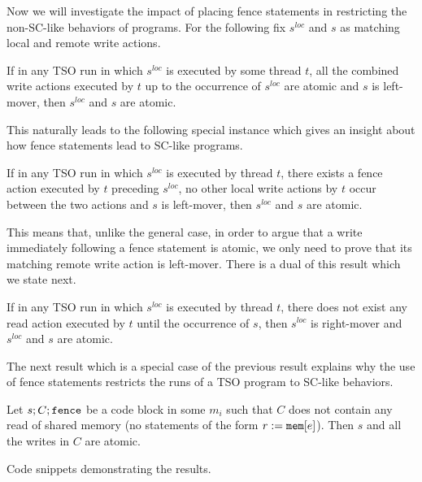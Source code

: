 Now we will investigate the impact of placing fence statements in restricting the non-SC-like behaviors of programs.
For the following fix $s^{loc}$ and $s$ as matching local and remote write actions.
\begin{lemma}
If in any TSO run in which $s^{loc}$ is executed by some thread $t$, all the combined write actions executed by $t$ up to the occurrence of $s^{loc}$ are atomic and $s$ is left-mover, then $s^{loc}$ and $s$ are atomic.
\end{lemma}
This naturally leads to the following special instance which gives an insight about how fence statements lead to SC-like programs.
\begin{corollary}
If in any TSO run in which $s^{loc}$ is executed by thread $t$, there exists a fence action executed by $t$ preceding $s^{loc}$, no other local write actions by $t$ occur between the two actions and $s$ is left-mover, then $s^{loc}$ and $s$ are atomic.
\end{corollary}
This means that, unlike the general case, in order to argue that a write immediately following a fence statement is atomic, we only need to prove that its matching remote write action is left-mover. 
There is a dual of this result which we state next.
\begin{lemma}
If in any TSO run in which $s^{loc}$ is executed by thread $t$, there does not exist any read action executed by $t$ until the occurrence of $s$, then $s^{loc}$ is right-mover and $s^{loc}$ and $s$ are atomic.
\end{lemma}
The next result which is a special case of the previous result explains why the use of fence statements restricts the runs of a TSO program to SC-like behaviors.
\begin{corollary}
Let $s;C;\mathtt{fence}$ be a code block in some $m_i$ such that $C$ does not contain any read of shared memory (no statements of the form $r:=\mathtt{mem}[e]$).
Then $s$ and all the writes in $C$ are atomic.
\end{corollary}


{\sc Code snippets demonstrating the results.}
